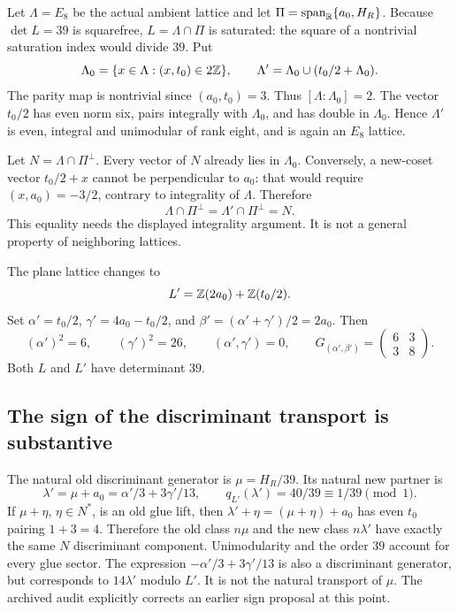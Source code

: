Let $\Lambda=E_8$ be the actual ambient lattice and let
$\Pi=\operatorname{span}_{\mathbb R}\{a_0,H_R\}$.
Because $\det L=39$ is squarefree, $L=\Lambda\cap\Pi$ is
saturated: the square of a nontrivial saturation index would divide
$39$. Put
\[
 \Lambda_0=\{x\in\Lambda:(x,t_0)\in2\mathbb Z\},\qquad
 \Lambda'=\Lambda_0\cup(t_0/2+\Lambda_0).
\]
The parity map is nontrivial since $(a_0,t_0)=3$.
Thus $[\Lambda:\Lambda_0]=2$. The vector $t_0/2$ has even norm
six, pairs integrally with $\Lambda_0$, and has double in
$\Lambda_0$. Hence $\Lambda'$ is even, integral and unimodular
of rank eight, and is again an $E_8$ lattice.

Let $N=\Lambda\cap\Pi^\perp$. Every vector of $N$ already lies
in $\Lambda_0$. Conversely, a new-coset vector $t_0/2+x$ cannot
be perpendicular to $a_0$: that would require
$(x,a_0)=-3/2$, contrary to integrality of $\Lambda$.
Therefore
\begin{equation}
 \Lambda\cap\Pi^\perp=\Lambda'\cap\Pi^\perp=N.
 \label{expstructure:perp-preserved}
\end{equation}
This equality needs the displayed integrality argument. It is not
a general property of neighboring lattices.

The plane lattice changes to
\[
 L'=\mathbb Z(2a_0)+\mathbb Z(t_0/2).
\]
Set $\alpha'=t_0/2$, $\gamma'=4a_0-t_0/2$, and
$\beta'=(\alpha'+\gamma')/2=2a_0$. Then
\[
 (\alpha')^2=6,\qquad (\gamma')^2=26,
 \qquad(\alpha',\gamma')=0,
 \qquad G_{(\alpha',\beta')}=
 \begin{pmatrix}6&3\\3&8\end{pmatrix}.
\]
Both $L$ and $L'$ have determinant $39$.

\subsection{The sign of the discriminant transport is substantive}

The natural old discriminant generator is
$\mu=H_R/39$. Its natural new partner is
\[
 \lambda'=\mu+a_0
 =\alpha'/3+3\gamma'/13,
 \qquad q_{L'}(\lambda')=40/39\equiv1/39\pmod1.
\]
If $\mu+\eta$, $\eta\in N^*$, is an old glue lift, then
$\lambda'+\eta=(\mu+\eta)+a_0$ has even $t_0$ pairing
$1+3=4$. Therefore the old class $n\mu$ and the new class
$n\lambda'$ have exactly the same $N$ discriminant component.
Unimodularity and the order $39$ account for every glue sector.
The expression $-\alpha'/3+3\gamma'/13$ is also a discriminant
generator, but corresponds to $14\lambda'$ modulo $L'$.
It is not the natural transport of $\mu$. The archived audit
explicitly corrects an earlier sign proposal at this point.

